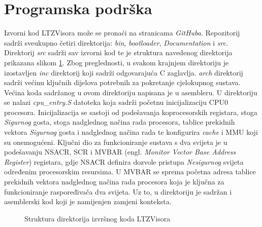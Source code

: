 \documentclass[times, utf8, diplomski, numeric]{fer}
\begin{document}
\section{Programska podrška}
Izvorni kod LTZVisora može se pronaći na stranicama \textit{GitHuba}. Repozitorij sadrži sveukupno četiri direktorija:
\textit{bin}, \textit{bootloader}, \textit{Documentation} i \textit{src}. Direktorij \textit{src} sadrži sav izvorni kod te
je struktura navedenog direktorija prikazana slikom \ref{srcdir}. Zbog preglednosti, u svakom krajnjem direktoriju je
izostavljen \textit{inc} direktorij koji sadrži odgovarajuća C zaglavlja.
\textit{arch} direktorij sadrži većinu ključnih dijelova potrebnih za pokretanje cjelokupnog sustava. Većina koda sadržanog u
ovom direktoriju napisana je u asembleru. U direktoriju se nalazi \textit{cpu\_entry.S} datoteka koja sadrži početnu
inicijalizaciju CPU0 procesora. Inicijalizacija se sastoji od podešavanja koprocesorskih registara, stoga \textit{Sigurnog} gosta,
stoga nadglednog načina rada procesora, tablice prekidnih vektora \textit{Sigurnog} gosta i nadglednog načina rada te konfigurira
\textit{cache} i MMU koji su onemogućeni. Ključni dio za funkcioniranje sustava s dva svijeta je u podešavanju NSACR, SCR
i MVBAR (engl. \textit{Monitor Vector Base Address Register}) registara, gdje NSACR definira dozvole pristupa \textit{Nesigurnog} svijeta
određenim procesorskim resursima. U MVBAR se sprema početna adresa tablice prekidnih vektora nadglednog načina rada procesora
koja je ključna za funkcioniranje raspoređivača dva svijeta. Uz to, u direktoriju je sadržan i asemblerski kod koji je
namijenjen zamjeni konteksta.

\begin{figure}[H]
  \centering
  \caption{Struktura direktorija izvršnog koda LTZVisora}
  \label{srcdir}
\end{figure}
\end{document}
